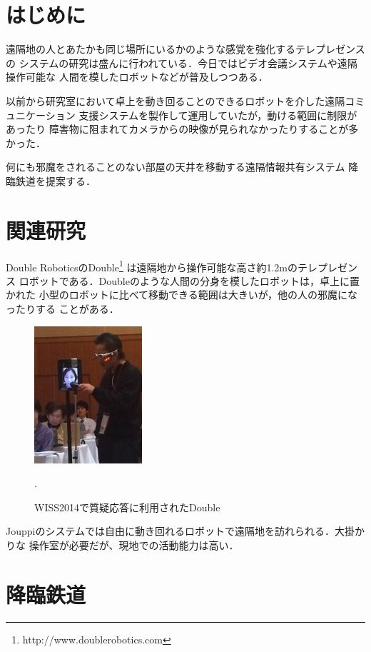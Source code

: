 \documentclass[submit,techreq]{ipsj}
\begin{document}
\section{はじめに}

遠隔地の人とあたかも同じ場所にいるかのような感覚を強化するテレプレゼンスの
システムの研究は盛んに行われている．今日ではビデオ会議システムや遠隔操作可能な
人間を模したロボットなどが普及しつつある．

以前から研究室において卓上を動き回ることのできるロボットを介した遠隔コミュニケーション
支援システムを製作して運用していたが\cite{Hirota:Korin}，動ける範囲に制限があったり
障害物に阻まれてカメラからの映像が見られなかったりすることが多かった．

何にも邪魔をされることのない部屋の天井を移動する遠隔情報共有システム
降臨鉄道を提案する．

\section{関連研究}

Double RoboticsのDouble\footnote{
  \textsf{http://www.doublerobotics.com}
}
は遠隔地から操作可能な高さ約1.2mのテレプレゼンス
ロボットである．Doubleのような人間の分身を模したロボットは，卓上に置かれた
小型のロボットに比べて移動できる範囲は大きいが，他の人の邪魔になったりする
ことがある．

\begin{figure}[H]
\centerline{\includegraphics[width=40mm]{figures/b74f4564d4b38d12e48fcf80fef96def.png}}
\caption{WISS2014で質疑応答に利用されたDouble}.
\label{screenshot1}
\end{figure}

Jouppiのシステム\cite{Jouppi:2002:FST:587078.587128}では自由に動き回れるロボットで遠隔地を訪れられる．大掛かりな
操作室が必要だが、現地での活動能力は高い．

\section{降臨鉄道}
\end{document}
